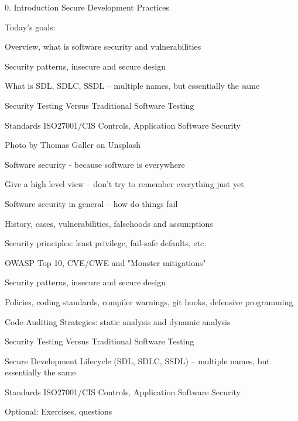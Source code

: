 \documentclass[Screen16to9,17pt]{foils}
\begin{document}
\mytitlepage
{0. Introduction}
{Secure Development Practices}

\hlkprofiluk



Today's goals:
\begin{list2}
\item Overview, what is software security and vulnerabilities
\item Security patterns, insecure and secure design
\item What is SDL, SDLC, SSDL -- multiple names, but essentially the same
\item Security Testing Versus Traditional Software Testing
\item Standards ISO27001/CIS Controls, Application Software Security
\end{list2}

  Photo by Thomas Galler on Unsplash



\begin{list1}
\item Software security - because software is everywhere
\item Give a high level view -- don't try to remember everything just yet
\end{list1}



\begin{list2}
\item Software security in general -- how do things fail
\item History, cases, vulnerabilities, falsehoods and assumptions
\item Security principles: least privilege, fail-safe defaults, etc.
\item OWASP Top 10, CVE/CWE and "Monster mitigations"
\item Security patterns, insecure and secure design
\item Policies, coding standards, compiler warnings, git hooks, defensive programming
\item Code-Auditing Strategies: static analysis and dynamic analysis
\item Security Testing Versus Traditional Software Testing
\item Secure Development Lifecycle (SDL, SDLC, SSDL) -- multiple names, but essentially the same
\item Standards ISO27001/CIS Controls, Application Software Security
\item Optional: Exercises, questions
\end{list2}
\end{document}
